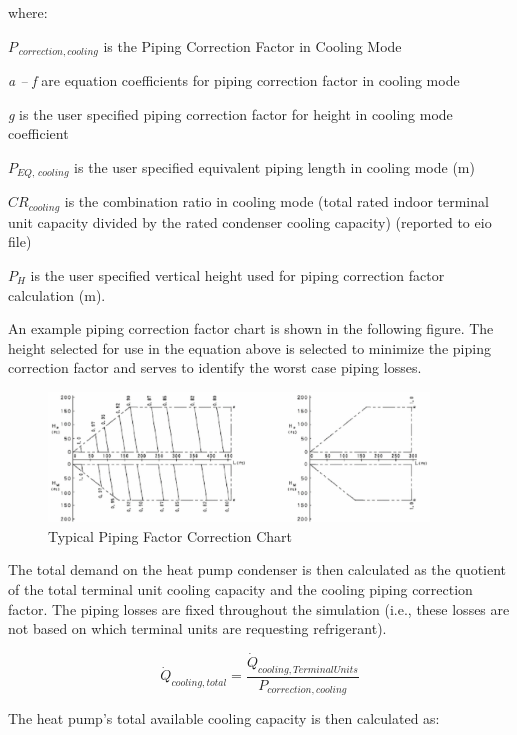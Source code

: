 where:

\({P_{\,correction,cooling}}\) is the Piping Correction Factor in Cooling Mode

\emph{a -- f} are equation coefficients for piping correction factor in cooling mode

\emph{g} is the user specified piping correction factor for height in cooling mode coefficient

\(P_{EQ,\,cooling}\) is the user specified equivalent piping length in cooling mode (m)

\(CR_{cooling}\) is the combination ratio in cooling mode (total rated indoor terminal unit capacity divided by the rated condenser cooling capacity) (reported to eio file)

\(P_H\) is the user specified vertical height used for piping correction factor calculation (m).

An example piping correction factor chart is shown in the following figure. The height selected for use in the equation above is selected to minimize the piping correction factor and serves to identify the worst case piping losses.

\begin{figure}[hbtp] %
\centering
\includegraphics[width=0.9\textwidth, height=0.9\textheight, keepaspectratio=true]{media/image5358.png}
\caption{Typical Piping Factor Correction Chart \label{fig:typical-piping-factor-correction-chart}}
\end{figure}

The total demand on the heat pump condenser is then calculated as the quotient of the total terminal unit cooling capacity and the cooling piping correction factor. The piping losses are fixed throughout the simulation (i.e., these losses are not based on which terminal units are requesting refrigerant).

\begin{equation}
  \dot{Q}_{cooling,total} = \frac{\dot{Q}_{cooling,TerminalUnits}}{P_{correction,cooling}}
\end{equation}

The heat pump's total available cooling capacity is then calculated as:

